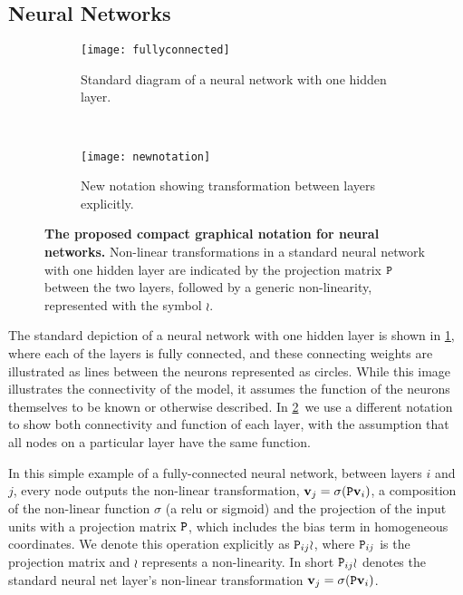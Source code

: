 \documentclass[thesis]{subfiles}
\begin{document}
	\subsection{Neural Networks}
	\begin{figure}[tbp] 
		\centering
		\begin{subfigure}[b]{0.45\textwidth}
			\centering
			\texttt{[image: fullyconnected]}
			\caption{Standard diagram of a neural network with one hidden layer.}\label{fig:oldnotation}
		\end{subfigure}
		~
		\begin{subfigure}[b]{0.45\textwidth}
			\centering
			\texttt{[image: newnotation]}
			\caption{New notation showing transformation between layers explicitly.}\label{fig:newnotation}
		\end{subfigure}
		\caption[New graphical notation for neural networks]{\textbf{The proposed compact graphical notation for neural networks.} Non-linear transformations in a standard neural network with one hidden layer are indicated by the projection matrix $\mat P$ between the two layers, followed by a generic non-linearity, represented with the symbol $\wr$.}\label{fig:newGraphLanguage}
	\end{figure}
	
	The standard depiction of a neural network with one hidden layer is shown in \cref{fig:oldnotation}, where each of the layers is fully connected, and these connecting weights are illustrated as lines between the neurons represented as circles. While this image illustrates the connectivity of the model, it assumes the function of the neurons themselves to be known or otherwise described. In \cref{fig:newnotation}\ we use a different notation to show both connectivity and function of each layer, with the assumption that all nodes on a particular layer have the same function.
	
	In this simple example of a fully-connected neural network, between layers $i$ and $j$, every node outputs the non-linear transformation, $\vec v_j = \sigma(\mat P \vec v_i)$, a composition of the non-linear function $\sigma$ (\eg a \gls{relu} or sigmoid) and the projection of the input units with a projection matrix $\mat P$, which includes the bias term in homogeneous coordinates. We denote this operation explicitly as $\mat P_{ij} \wr$, where $\mat P_{ij}$ is the projection matrix and $\wr$ represents a non-linearity. In short $\mat P_{ij} \wr$ denotes the standard neural net layer's non-linear transformation $\vec v_j = \sigma(\mat P \vec v_i)$. 
	
\end{document}
